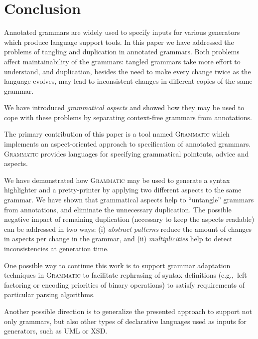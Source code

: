 \documentclass[10pt]{llncs}
\newcommand{\tool}[1]{\textsc{#1}}
\newcommand{\Grammatic}[0]{\tool{Grammatic}}
\begin{document}
\section{Conclusion}\label{Conclusion}

Annotated grammars are widely used to specify inputs for various generators which produce language support tools.
In this paper we have addressed the problems of tangling and duplication in annotated grammars. Both problems affect maintainability of the grammars: tangled grammars take more effort to understand, and duplication, besides the need to make every change twice as the language evolves, may lead to inconsistent changes in different copies of the same grammar.

We have introduced \emph{grammatical aspects} and showed how they may be used to cope with these problems by separating context-free grammars from annotations. 

The primary contribution of this paper is a tool named \Grammatic{} which implements an aspect-oriented approach to specification of annotated grammars. \Grammatic{} provides languages for specifying grammatical pointcuts, advice and aspects.

We have demonstrated how \Grammatic{} may be used to generate a syntax highlighter and a pretty-printer by applying two different aspects to the same grammar. We have shown that grammatical aspects help to ``untangle'' grammars from annotations, and eliminate the unnecessary duplication. The possible negative impact of remaining duplication (necessary to keep the aspects readable) can be addressed in two ways:
	(i) \emph{abstract patterns} reduce the amount of changes in aspects per change in the grammar, and
	(ii) \emph{multiplicities} help to detect inconsistencies at generation time.

One possible way to continue this work is to support grammar adaptation techniques \cite{Laemmel} in \Grammatic{} to facilitate rephrasing of syntax definitions (e.g.,~left factoring or encoding priorities of binary operations) to satisfy requirements of particular parsing algorithms.

Another possible direction is to generalize the presented approach to support not only grammars, but also other types of declarative languages used as inputs for generators, such as UML or XSD.



\end{document}
